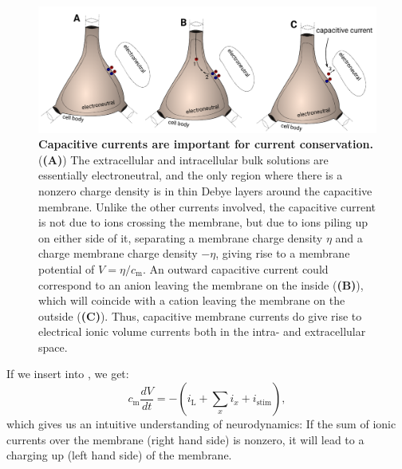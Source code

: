 \begin{figure}[!ht]
\begin{center}
\includegraphics[width=1.0\textwidth]{Figures/Neuron/capacitive_currents.pdf}
\end{center}
\caption{\textbf{Capacitive currents are important for current conservation.}  (\textbf{(A)}) The extracellular and intracellular bulk solutions are essentially electroneutral, and the only region where there is a nonzero charge density is in thin Debye layers around the capacitive membrane. Unlike the other currents involved, the capacitive current is not due to ions crossing the membrane, but due to ions piling up on either side of it, separating a membrane charge density $\eta$ and a charge membrane charge density $-\eta$, giving rise to a membrane potential of $V = \eta/c_{\mathrm{m}}$. An outward capacitive current could correspond to an anion leaving the membrane on the inside (\textbf{(B)}), which will coincide with a cation leaving the membrane on the outside (\textbf{(C)}). Thus, capacitive membrane currents do give rise to electrical ionic volume currents both in the intra- and extracellular space.
}
\label{fig:Neuron:capacitive_currents}
\end{figure}

If we insert  into , we get:
\begin{equation}
c_{\mathrm{m}} \frac{dV}{dt} = - (i_{\mathrm{L}} + \sum_x{i_x} +  i_{\mathrm{stim}}),
\label{eq:Neuron:singlecomp_capinserted}
\end{equation}
which gives us an intuitive understanding of neurodynamics: If the sum of ionic currents over the membrane (right hand side) is nonzero, it will lead to a charging up (left hand side) of the membrane. 


